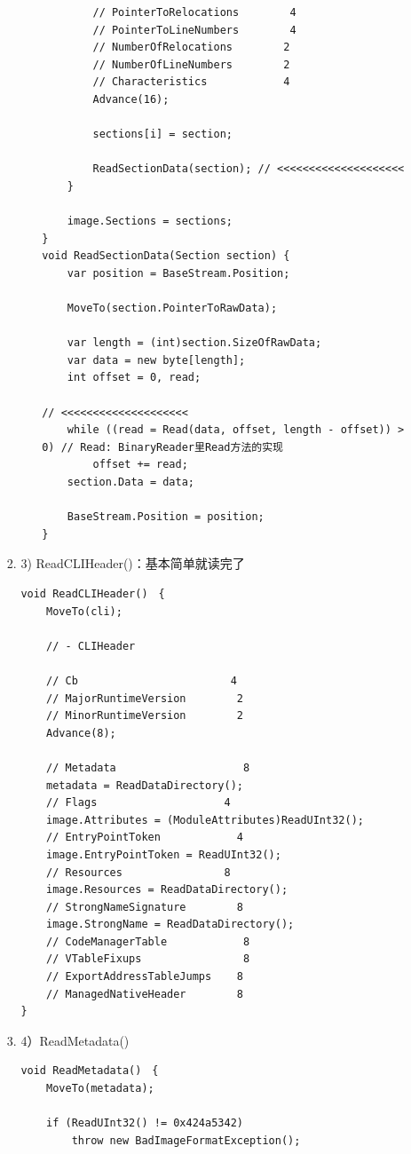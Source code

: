\documentclass[9pt, b5paper]{article}
\begin{document}
\begin{enumerate}
\begin{enumerate}
\begin{enumerate}
\begin{itemize}
\begin{verbatim}
        // PointerToRelocations        4
        // PointerToLineNumbers        4
        // NumberOfRelocations        2
        // NumberOfLineNumbers        2
        // Characteristics            4
        Advance(16);

        sections[i] = section;

        ReadSectionData(section); // <<<<<<<<<<<<<<<<<<<< 
    }

    image.Sections = sections;
}
void ReadSectionData(Section section) {
    var position = BaseStream.Position;

    MoveTo(section.PointerToRawData);

    var length = (int)section.SizeOfRawData;
    var data = new byte[length];
    int offset = 0, read;

// <<<<<<<<<<<<<<<<<<<< 
    while ((read = Read(data, offset, length - offset)) > 0) // Read: BinaryReader里Read方法的实现
        offset += read;
    section.Data = data;

    BaseStream.Position = position;
}
\end{verbatim}
\end{itemize}
\item 3) ReadCLIHeader()：基本简单就读完了
\label{sec-10-1-3-1-3-3}
\begin{verbatim}
void ReadCLIHeader()　{
    MoveTo(cli);

    // - CLIHeader

    // Cb                        4
    // MajorRuntimeVersion        2
    // MinorRuntimeVersion        2
    Advance(8);

    // Metadata                    8
    metadata = ReadDataDirectory();
    // Flags                    4
    image.Attributes = (ModuleAttributes)ReadUInt32();
    // EntryPointToken            4
    image.EntryPointToken = ReadUInt32();
    // Resources                8
    image.Resources = ReadDataDirectory();
    // StrongNameSignature        8
    image.StrongName = ReadDataDirectory();
    // CodeManagerTable            8
    // VTableFixups                8
    // ExportAddressTableJumps    8
    // ManagedNativeHeader        8
}
\end{verbatim}
\item 4）ReadMetadata()
\label{sec-10-1-3-1-3-4}
\begin{verbatim}
void ReadMetadata()　{
    MoveTo(metadata);

    if (ReadUInt32() != 0x424a5342)
        throw new BadImageFormatException();


\end{verbatim}
\end{enumerate}
\end{enumerate}
\end{enumerate}
\end{document}
